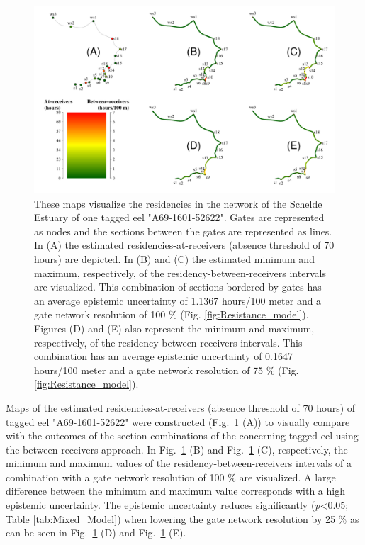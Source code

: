 \documentclass[preprint,12pt,authoryear]{elsarticle}
\begin{document}
\begin{spacing}{1.9}
\begin{figure}[h!]
  \centering\includegraphics[scale=0.35]{Map_Network_Analysis.pdf}
  \caption{These maps visualize the residencies in the network of the Schelde Estuary of one tagged eel "A69-1601-52622". Gates are represented as nodes and the sections between the gates are represented as lines. In (A) the estimated residencies-at-receivers (absence threshold of 70 hours) are depicted. In (B) and (C) the estimated minimum and maximum, respectively, of the residency-between-receivers intervals are visualized. This combination of sections bordered by gates has an average epistemic uncertainty of 1.1367 hours/100 meter and a gate network resolution of 100 \% (Fig. \ref{fig:Resistance_model}). Figures (D) and (E) also represent the minimum and maximum, respectively, of the residency-between-receivers intervals. This combination has an average epistemic uncertainty of  0.1647 hours/100 meter and a gate network resolution of 75 \% (Fig. \ref{fig:Resistance_model}).}
  \label{fig:Map_Network_Analysis}
\end{figure}

Maps of the estimated residencies-at-receivers (absence threshold of 70 hours) of tagged eel "A69-1601-52622" were constructed (Fig.~\ref{fig:Map_Network_Analysis} (A)) to visually compare with the outcomes of the section combinations of the concerning tagged eel using the between-receivers approach. In Fig.~\ref{fig:Map_Network_Analysis} (B) and Fig.~\ref{fig:Map_Network_Analysis} (C), respectively, the minimum and maximum values of the residency-between-receivers intervals of a combination with a gate network resolution of 100 \% are visualized. A large difference between the minimum and maximum value corresponds with a high epistemic uncertainty. The epistemic uncertainty reduces significantly (\textit{p}<0.05; Table \ref{tab:Mixed_Model}) when lowering the gate network resolution by 25 \% as can be seen in Fig.~\ref{fig:Map_Network_Analysis} (D) and Fig.~\ref{fig:Map_Network_Analysis} (E). 


\end{spacing}
\end{document}

